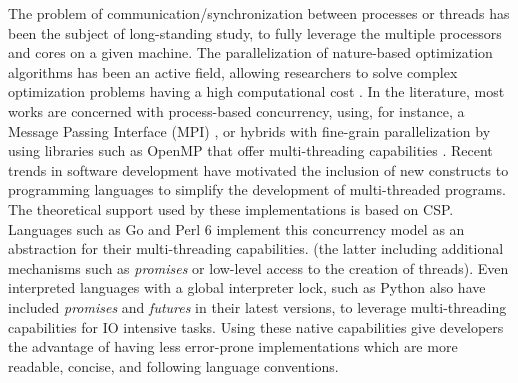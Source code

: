 \documentclass[runningheads]{llncs}\usepackage[]{graphicx}\usepackage[]{color}
\begin{document}
The problem of communication/synchronization
between processes or threads has been the subject of long-standing study,
to fully leverage the multiple
processors and cores on a given machine. The parallelization of nature-based
optimization algorithms has been an active field, allowing researchers 
to solve complex optimization problems having a high computational 
cost \cite{Lalwani2019}. In the literature, most works are concerned 
with process-based concurrency, using, for instance, a Message Passing Interface 
(MPI) \cite{gropp1999using}, or hybrids with fine-grain
parallelization by using libraries such as OpenMP \cite{dagum1998openmp}
that offer multi-threading capabilities \cite{jin2011high}. Recent trends
in software development have motivated the inclusion of new 
constructs to programming languages to simplify
the development of multi-threaded programs. The theoretical support 
used by these implementations is based on CSP. Languages such as Go 
and Perl 6 implement this concurrency model as an abstraction for 
their multi-threading capabilities. (the latter including additional mechanisms such as 
{\em promises} or low-level access to the creation of threads). Even 
interpreted languages with a global interpreter lock, such as Python also
have included {\em promises} and {\em futures} in their latest versions,
to leverage multi-threading capabilities for IO intensive tasks.
Using these native capabilities give developers the advantage of
having less error-prone implementations which are more readable, concise, and
following language conventions. 






\end{document}
